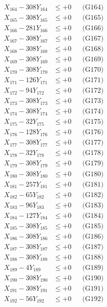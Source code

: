 \documentclass[a4paper,10pt]{article}
\begin{document}
{\begin{align}
X_{164} - 308Y_{164} &\leq +0 && \text{(G164)} \\
X_{165} - 308Y_{165} &\leq +0 && \text{(G165)} \\
X_{166} - 281Y_{166} &\leq +0 && \text{(G166)} \\
X_{167} - 308Y_{167} &\leq +0 && \text{(G167)} \\
X_{168} - 308Y_{168} &\leq +0 && \text{(G168)} \\
X_{169} - 308Y_{169} &\leq +0 && \text{(G169)} \\
X_{170} - 308Y_{170} &\leq +0 && \text{(G170)} \\
\allowbreak
X_{171} - 126Y_{171} &\leq +0 && \text{(G171)} \\
X_{172} - 94Y_{172} &\leq +0 && \text{(G172)} \\
X_{173} - 308Y_{173} &\leq +0 && \text{(G173)} \\
X_{174} - 308Y_{174} &\leq +0 && \text{(G174)} \\
X_{175} - 32Y_{175} &\leq +0 && \text{(G175)} \\
X_{176} - 128Y_{176} &\leq +0 && \text{(G176)} \\
X_{177} - 308Y_{177} &\leq +0 && \text{(G177)} \\
X_{178} - 32Y_{178} &\leq +0 && \text{(G178)} \\
X_{179} - 308Y_{179} &\leq +0 && \text{(G179)} \\
X_{180} - 308Y_{180} &\leq +0 && \text{(G180)} \\
\allowbreak
X_{181} - 257Y_{181} &\leq +0 && \text{(G181)} \\
X_{182} - 65Y_{182} &\leq +0 && \text{(G182)} \\
X_{183} - 96Y_{183} &\leq +0 && \text{(G183)} \\
X_{184} - 127Y_{184} &\leq +0 && \text{(G184)} \\
X_{185} - 308Y_{185} &\leq +0 && \text{(G185)} \\
X_{186} - 308Y_{186} &\leq +0 && \text{(G186)} \\
X_{187} - 308Y_{187} &\leq +0 && \text{(G187)} \\
X_{188} - 308Y_{188} &\leq +0 && \text{(G188)} \\
X_{189} - 4Y_{189} &\leq +0 && \text{(G189)} \\
X_{190} - 308Y_{190} &\leq +0 && \text{(G190)} \\
\allowbreak
X_{191} - 308Y_{191} &\leq +0 && \text{(G191)} \\
X_{192} - 56Y_{192} &\leq +0 && \text{(G192)} \\

\end{align}}
\end{document}
